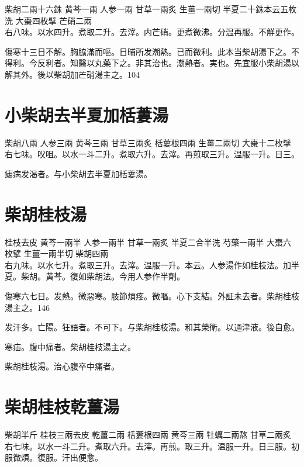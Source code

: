 柴胡{\scriptsize 二兩十六銖} 黄芩{\scriptsize 一兩} 人参{\scriptsize 一兩} 甘草{\scriptsize 一兩炙} 生薑{\scriptsize 一兩切} 半夏{\scriptsize 二十銖本云五枚洗} 大棗{\scriptsize 四枚擘} 芒硝{\scriptsize 二兩}\\
右八味。以水四升。煮取二升。去滓。内芒硝。更煮微沸。分温再服。不觧更作。

傷寒十三日不解。胸脇滿而嘔。日晡所发潮熱{\khaaitp 。已}而微利。此本当柴胡湯下之。不得利。今反利者。知醫以丸藥下之。非其治也。潮熱者。実也。先宜服小柴胡湯以解其外。後以柴胡加芒硝湯主之。104

\section{小柴胡去半夏加栝蔞湯}

柴胡{\scriptsize 八兩} 人参{\scriptsize 三兩} 黄芩{\scriptsize 三兩} 甘草{\scriptsize 三兩炙} 栝蔞根{\scriptsize 四兩} 生薑{\scriptsize 二兩切} 大棗{\scriptsize 十二枚擘}\\
右七味。㕮咀。以水一斗二升。煮取六升。去滓。再煎取三升。温服一升。日三。

瘧病发渴者。与小柴胡去半夏加栝蔞湯。

\section{柴胡桂枝湯}

桂枝{\scriptsize 去皮} 黄芩{\scriptsize 一兩半} 人参{\scriptsize 一兩半} 甘草{\scriptsize 一兩炙} 半夏{\scriptsize 二合半洗} 芍藥{\scriptsize 一兩半} 大棗{\scriptsize 六枚擘} 生薑{\scriptsize 一兩半切} 柴胡{\scriptsize 四兩}\\
右九味。以水七升。煮取三升。去滓。温服一升。本云。人参湯作如桂枝法。加半夏。柴胡。黄芩。復如柴胡法。今用人参作半劑。

傷寒六七日。发熱。微惡寒。肢節煩疼。微嘔。心下支結。外証未去者。柴胡桂枝湯主之。146

发汗多。亡陽。狂語者。不可下。与柴胡桂枝湯。和其榮衛。以通津液。後自愈。

寒疝。腹中痛者。柴胡桂枝湯主之。{\wuben}

柴胡桂枝湯。治心腹卒中痛者。{\dengben}

\section{柴胡桂枝乾薑湯}

柴胡{\scriptsize 半斤} 桂枝{\scriptsize 三兩去皮} 乾薑{\scriptsize 二兩} 栝蔞根{\scriptsize 四兩} 黄芩{\scriptsize 三兩} 牡蠣{\scriptsize 二兩熬} 甘草{\scriptsize 二兩炙}\\
右七味。以水一斗二升。煮取六升。去滓。再煎。取三升。温服一升。日三服。初服微煩。復服。汗出便愈。


